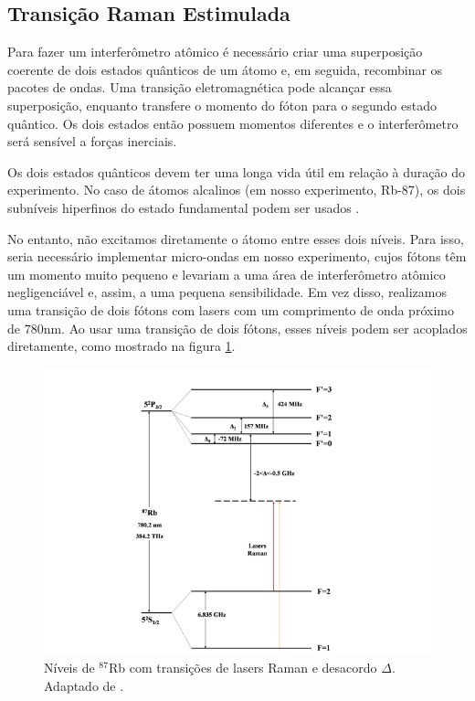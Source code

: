 \subsection{Transição Raman Estimulada}
Para fazer um interferômetro atômico é necessário criar uma superposição coerente de dois estados quânticos de um átomo e, em seguida, recombinar os pacotes de ondas. Uma transição eletromagnética pode alcançar essa superposição, enquanto transfere o momento do fóton para o segundo estado quântico. Os dois estados então possuem momentos diferentes e o interferômetro será sensível a forças inerciais.

Os dois estados quânticos devem ter uma longa vida útil em relação à duração do experimento. No caso de átomos alcalinos (em nosso experimento, Rb-87), os dois subníveis hiperfinos do estado fundamental podem ser usados \cite{cheinet2006conception}.

No entanto, não excitamos diretamente o átomo entre esses dois níveis. Para isso, seria necessário implementar micro-ondas em nosso experimento, cujos fótons têm um momento muito pequeno e levariam a uma área de interferômetro atômico negligenciável e, assim, a uma pequena sensibilidade. Em vez disso, realizamos uma transição de dois fótons com lasers com um comprimento de onda próximo de 780nm. Ao usar uma transição de dois fótons, esses níveis podem ser acoplados diretamente, como mostrado na figura \ref{fig:levels}.

\begin{figure}
    \centering
    \includegraphics[width=0.8\linewidth]{figures/raman-levels.png}
    \caption{Níveis de $^{87}$Rb com transições de lasers Raman e desacordo $\Delta$. Adaptado de \cite{cheinet2006conception}.}
    \label{fig:levels}
\end{figure}

